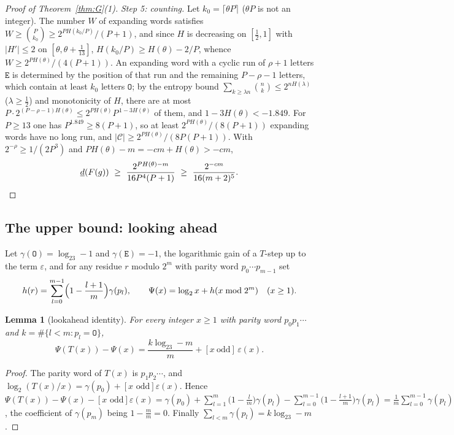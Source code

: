 \documentclass[11pt]{article}
\newtheorem{lemma}[theorem]{Lemma}
\theoremstyle{definition}
\theoremstyle{remark}
\begin{document}
\begin{proof}[Proof of Theorem~\ref{thm:G}(1)]
\emph{Step 5: counting.} Let $k_0=\lceil\theta P\rceil$ ($\theta P$ is
not an integer). The number $W$ of expanding words satisfies
$W\ge\binom{P}{k_0}\ge2^{PH(k_0/P)}/(P+1)$, and since $H$ is decreasing on
$[\tfrac12,1]$ with $|H'|\le2$ on $[\theta,\theta+\tfrac1{13}]$,
$H(k_0/P)\ge H(\theta)-2/P$, whence $W\ge2^{PH(\theta)}/(4(P+1))$. An
expanding word with a cyclic run of $\rho+1$ letters $\mathtt E$ is
determined by the position of that run and the remaining $P-\rho-1$
letters, which contain at least $k_0$ letters $\mathtt O$; by the entropy
bound $\sum_{k\ge\lambda n}\binom nk\le2^{nH(\lambda)}$ ($\lambda\ge\tfrac12$)
and monotonicity of $H$, there are at most
$P\cdot2^{(P-\rho-1)H(\theta)}\le2^{PH(\theta)}P^{\,1-3H(\theta)}$ of them,
and $1-3H(\theta)<-1.849$. For $P\ge13$ one has $P^{1.849}\ge8(P+1)$, so
at least $2^{PH(\theta)}/(8(P+1))$ expanding words have no long run,
and $|\mathcal C|\ge2^{PH(\theta)}/(8P(P+1))$. With
$2^{-\rho}\ge1/(2P^{3})$ and $PH(\theta)-m=-cm+H(\theta)>-cm$,
\[
\underline d(F(g))\ \ge\ \frac{2^{PH(\theta)-m}}{16P^{4}(P+1)}
\ \ge\ \frac{2^{-cm}}{16(m+2)^{5}} .\qedhere
\]
\end{proof}

\subsection*{The upper bound: looking ahead}

Let $\gamma(\mathtt O)=\log_23-1$ and $\gamma(\mathtt E)=-1$, the
logarithmic gain of a $T$-step up to the term $\varepsilon$, and for any
residue $r$ modulo $2^{m}$ with parity word $p_0\cdots p_{m-1}$ set
\[
h(r)=\sum_{l=0}^{m-1}\Bigl(1-\frac{l+1}{m}\Bigr)\gamma(p_l),
\qquad
\Psi(x)=\log_2x+h(x\bmod2^{m})\quad(x\ge1).
\]

\begin{lemma}[lookahead identity]\label{lem:lookahead}
For every integer $x\ge1$ with parity word $p_0p_1\cdots$ and
$k=\#\{l<m:p_l=\mathtt O\}$,
\[
\Psi(T(x))-\Psi(x)=\frac{k\log_23-m}{m}+[x\ \text{odd}]\,\varepsilon(x).
\]
\end{lemma}

\begin{proof}
The parity word of $T(x)$ is $p_1p_2\cdots$, and
$\log_2(T(x)/x)=\gamma(p_0)+[x\text{ odd}]\varepsilon(x)$. Hence
$\Psi(T(x))-\Psi(x)-[x\text{ odd}]\varepsilon(x)
=\gamma(p_0)+\sum_{l=1}^{m}\bigl(1-\tfrac lm\bigr)\gamma(p_l)
-\sum_{l=0}^{m-1}\bigl(1-\tfrac{l+1}m\bigr)\gamma(p_l)
=\tfrac1m\sum_{l=0}^{m-1}\gamma(p_l)$, the coefficient of $\gamma(p_m)$
being $1-\tfrac mm=0$. Finally $\sum_{l<m}\gamma(p_l)=k\log_23-m$.
\end{proof}
\end{document}
